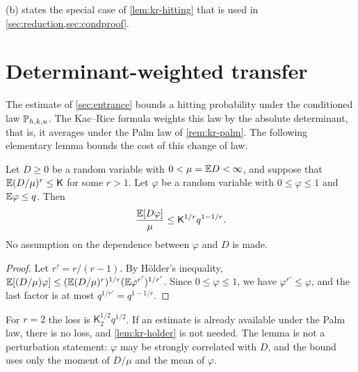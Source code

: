 (b) states the special case of \cref{lem:kr-hitting} that is used in \cref{sec:reduction,sec:condproof}.

\section{Determinant-weighted transfer}\label{sec:kr-transfer}

The estimate of \cref{sec:entrance} bounds a hitting probability under the conditioned law $\mathbb P_{h,k,u}$. The Kac--Rice formula weights this law by the absolute determinant, that is, it averages under the Palm law of \cref{rem:kr-palm}. The following elementary lemma bounds the cost of this change of law.

\begin{lemma}\label{lem:kr-holder}
Let $D\ge0$ be a random variable with $0<\mu=\mathbb E D<\infty$, and suppose that $\mathbb E(D/\mu)^r\le\mathsf K$ for some $r>1$. Let $\varphi$ be a random variable with $0\le\varphi\le1$ and $\mathbb E\varphi\le q$. Then
\begin{equation}\label{eq:kr-holder}
\frac{\mathbb E[D\varphi]}\mu\le\mathsf K^{1/r}q^{1-1/r}.
\end{equation}
No assumption on the dependence between $\varphi$ and $D$ is made.
\end{lemma}

\begin{proof}
Let $r'=r/(r-1)$. By H\"older's inequality, $\mathbb E[(D/\mu)\varphi]\le(\mathbb E(D/\mu)^r)^{1/r}(\mathbb E\varphi^{r'})^{1/r'}$. Since $0\le\varphi\le1$, we have $\varphi^{r'}\le\varphi$, and the last factor is at most $q^{1/r'}=q^{1-1/r}$.
\end{proof}

For $r=2$ the loss is $\mathsf K_2^{1/2}q^{1/2}$. If an estimate is already available under the Palm law, there is no loss, and \cref{lem:kr-holder} is not needed. The lemma is not a perturbation statement: $\varphi$ may be strongly correlated with $D$, and the bound uses only the moment of $D/\mu$ and the mean of $\varphi$.

